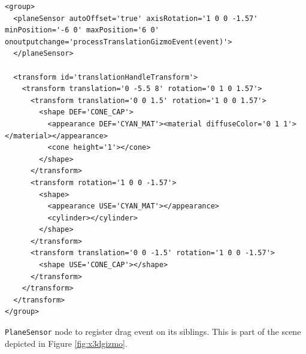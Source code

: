 \begin{listing}
  \begin{verbatim}
<group>
  <planeSensor autoOffset='true' axisRotation='1 0 0 -1.57' minPosition='-6 0' maxPosition='6 0' onoutputchange='processTranslationGizmoEvent(event)'>
  </planeSensor>

  <transform id='translationHandleTransform'>
    <transform translation='0 -5.5 8' rotation='0 1 0 1.57'>
      <transform translation='0 0 1.5' rotation='1 0 0 1.57'>
        <shape DEF='CONE_CAP'>
          <appearance DEF='CYAN_MAT'><material diffuseColor='0 1 1'></material></appearance>
          <cone height='1'></cone>
        </shape>
      </transform>
      <transform rotation='1 0 0 -1.57'>
        <shape>
          <appearance USE='CYAN_MAT'></appearance>
          <cylinder></cylinder>
        </shape>
      </transform>
      <transform translation='0 0 -1.5' rotation='1 0 0 -1.57'>
        <shape USE='CONE_CAP'></shape>
      </transform>
    </transform>
  </transform>
</group>
  \end{verbatim}
  \caption{\texttt{PlaneSensor} node to register drag event on its siblings. This is part of the scene depicted in Figure \ref{fig:x3dgizmo}.}
  \label{planesensor}
\end{listing}

